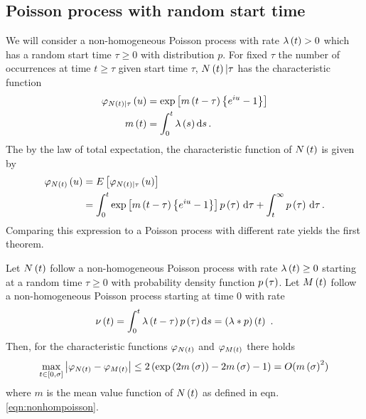 \documentclass{amsart}
\numberwithin{equation}{section}
\begin{document}
\subsection{Poisson process with random start time}
We will consider a non-homogeneous Poisson process with rate $\lambda\left(t\right) > 0$ which has a random start time $\tau \geq 0$ with distribution $p$. For fixed $\tau$ the number of occurrences at time $t \geq \tau$ given start time $\tau$, $N\left(t\right) \vert \tau$ has the characteristic function \cite[chapter 4, eqn. (2.1)]{parzen1962stochastic}
\begin{align}\label{eqn:nonhompoisson}
\begin{split}
\varphi_{N\left(t\right) \vert \tau}\left(u\right) &= \exp\left[m\left(t - \tau\right) \left\{e^{i u} - 1\right\}\right] \\
m\left(t\right) &= \int_0^t \lambda\left(s\right) \mathrm{d}s \, .
\end{split}
\end{align}
The by the law of total expectation, the characteristic function of $N\left(t\right)$ is given by
\begin{align*}
\varphi_{N\left(t\right)}\left(u\right) &= E\left[\varphi_{N\left(t\right) \vert \tau}\left(u\right)\right] \\
&=\int_0^t \exp\left[m\left(t - \tau\right) \left\{e^{i u} - 1\right\}\right] p \left(\tau\right) \, \mathrm{d}\tau + \int_t^\infty p \left(\tau\right) \, \mathrm{d}\tau \, .
\end{align*}
Comparing this expression to a Poisson process with different rate yields the first theorem.
\begin{theorem}\label{thm:iteratedpoisson}
Let $N\left(t\right)$ follow a non-homogeneous Poisson process with rate $\lambda\left(t\right) \geq 0$ starting at a random time $\tau \geq 0$ with probability density function $p\left(\tau\right)$. Let $M\left(t\right)$ follow a non-homogeneous Poisson process starting at time $0$ with rate
\begin{equation}
\nu\br{t} = \int_0^t\lambda\br{t-\tau} p\br{\tau} \ds = \br{\lambda \ast p}\br{t} \ .
\end{equation}
Then, for the characteristic functions $\varphi_{N\left(t\right)}$ and $\varphi_{M\left(t\right)}$ there holds
\begin{equation}
\max_{t \in \left[0, \sigma\right]} \left|\varphi_{N\left(t\right)} - \varphi_{M\left(t\right)}\right|
\leq 2 \left(\exp\left(2 m\left(\sigma\right)\right) - 2m\left(\sigma\right) - 1\right)
= O (m\left(\sigma\right)^2) \,
\end{equation}
where $m$ is the mean value function of $N\left(t\right)$ as defined in eqn. \eqref{eqn:nonhompoisson}.
\end{theorem}
\end{document}
